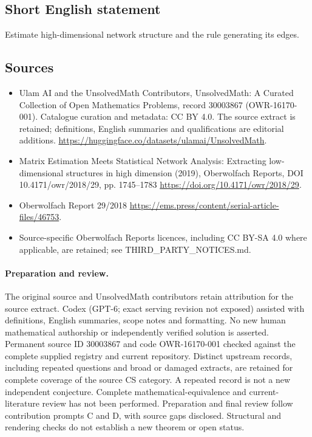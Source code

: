 \documentclass[11pt]{article}
\begin{document}
\subsection{Short English statement}
Estimate high-dimensional network structure and the rule generating its edges.
\subsection{Sources}
\begin{itemize}
\item[\hypertarget{source:30003867:1}{S1}] Ulam AI and the UnsolvedMath Contributors, UnsolvedMath: A Curated Collection of Open Mathematics Problems, record 30003867 (OWR-16170-001). Catalogue curation and metadata: CC BY 4.0. The source extract is retained; definitions, English summaries and qualifications are editorial additions.
\url{https://huggingface.co/datasets/ulamai/UnsolvedMath}.
\item[\hypertarget{source:30003867:2}{S2}] Matrix Estimation Meets Statistical Network Analysis: Extracting low-dimensional structures in high dimension (2019), Oberwolfach Reports, DOI 10.4171/owr/2018/29, pp. 1745--1783
\url{https://doi.org/10.4171/owr/2018/29}.
\item[\hypertarget{source:30003867:3}{S3}] Oberwolfach Report 29/2018
\url{https://ems.press/content/serial-article-files/46753}.
\item Source-specific Oberwolfach Reports licences, including CC BY-SA 4.0 where applicable, are retained; see THIRD\_PARTY\_NOTICES.md.
\end{itemize}
\paragraph{Preparation and review.}
The original source and UnsolvedMath contributors retain attribution for the source extract. Codex (GPT-6; exact serving revision not exposed) assisted with definitions, English summaries, scope notes and formatting. No new human mathematical authorship or independently verified solution is asserted. Permanent source ID 30003867 and code OWR-16170-001 checked against the complete supplied registry and current repository. Distinct upstream records, including repeated questions and broad or damaged extracts, are retained for complete coverage of the source CS category. A repeated record is not a new independent conjecture. Complete mathematical-equivalence and current-literature review has not been performed. Preparation and final review follow contribution prompts C and D, with source gaps disclosed. Structural and rendering checks do not establish a new theorem or open status.
\label{end:30003867}
\end{document}
